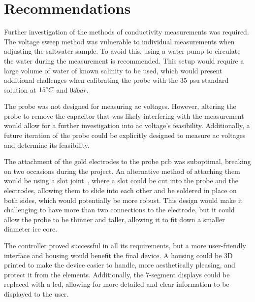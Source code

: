 
\chapter{Recommendations}\label{ch:recommendations}

Further investigation of the methods of conductivity measurements was required.
The voltage sweep method was vulnerable to individual measurements when adjusting the saltwater sample.
To avoid this, using a water pump to circulate the water during the measurement is recommended.
This setup would require a large volume of water of known salinity to be used, which would present additional challenges when calibrating the probe with the $35$ \gls{psu} standard solution at $15\degree C$ and $0dbar$.

The probe was not designed for measuring \gls{ac} voltages.
However, altering the probe to remove the capacitor that was likely interfering with the measurement would allow for a further investigation into \gls{ac} voltage's feasibility.
Additionally, a future iteration of the probe could be explicitly designed to measure \gls{ac} voltages and determine its feasibility.

The attachment of the gold electrodes to the probe \gls{pcb} was suboptimal, breaking on two occasions during the project.
An alternative method of attaching them would be using a slot joint~\cite{nicolaas_slot_joint_2015}, where a slot could be cut into the probe and the electrodes, allowing them to slide into each other and be soldered in place on both sides, which would potentially be more robust.
This design would make it challenging to have more than two connections to the electrode, but it could allow the probe to be thinner and taller, allowing it to fit down a smaller diameter ice core.

The controller proved successful in all its requirements, but a more user-friendly interface and housing would benefit the final device.
A housing could be 3D printed to make the device easier to handle, more aesthetically pleasing, and protect it from the elements.
Additionally, the 7-segment displays could be replaced with a \gls{lcd}, allowing for more detailed and clear information to be displayed to the user.
